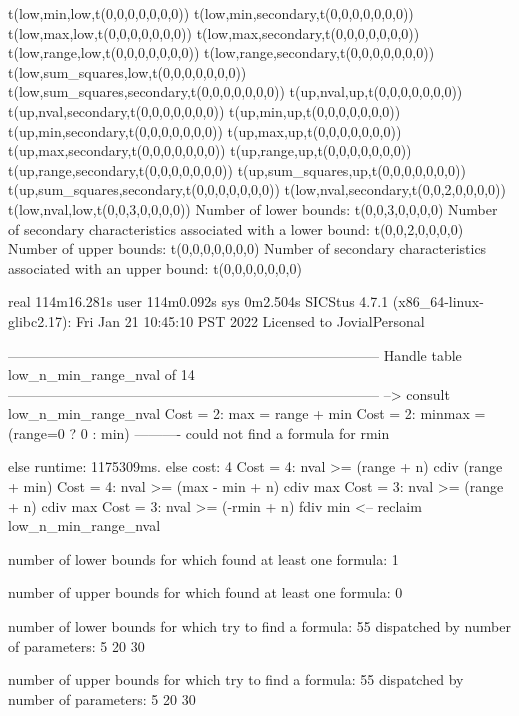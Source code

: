 t(low,min,low,t(0,0,0,0,0,0,0))
t(low,min,secondary,t(0,0,0,0,0,0,0))
t(low,max,low,t(0,0,0,0,0,0,0))
t(low,max,secondary,t(0,0,0,0,0,0,0))
t(low,range,low,t(0,0,0,0,0,0,0))
t(low,range,secondary,t(0,0,0,0,0,0,0))
t(low,sum_squares,low,t(0,0,0,0,0,0,0))
t(low,sum_squares,secondary,t(0,0,0,0,0,0,0))
t(up,nval,up,t(0,0,0,0,0,0,0))
t(up,nval,secondary,t(0,0,0,0,0,0,0))
t(up,min,up,t(0,0,0,0,0,0,0))
t(up,min,secondary,t(0,0,0,0,0,0,0))
t(up,max,up,t(0,0,0,0,0,0,0))
t(up,max,secondary,t(0,0,0,0,0,0,0))
t(up,range,up,t(0,0,0,0,0,0,0))
t(up,range,secondary,t(0,0,0,0,0,0,0))
t(up,sum_squares,up,t(0,0,0,0,0,0,0))
t(up,sum_squares,secondary,t(0,0,0,0,0,0,0))
t(low,nval,secondary,t(0,0,2,0,0,0,0))
t(low,nval,low,t(0,0,3,0,0,0,0))
Number of lower bounds:                                             t(0,0,3,0,0,0,0)
Number of secondary characteristics associated with a lower bound:  t(0,0,2,0,0,0,0)
Number of upper bounds:                                             t(0,0,0,0,0,0,0)
Number of secondary characteristics associated with an upper bound: t(0,0,0,0,0,0,0)

real	114m16.281s
user	114m0.092s
sys	0m2.504s
SICStus 4.7.1 (x86_64-linux-glibc2.17): Fri Jan 21 10:45:10 PST 2022
Licensed to JovialPersonal


--------------------------------------------------------------------------------
Handle table low_n_min_range_nval of 14
--------------------------------------------------------------------------------
--> consult low_n_min_range_nval
Cost =  2:  max    = range + min
Cost =  2:  minmax = (range=0 ? 0 : min)
----------
could not find a formula for rmin

else runtime: 1175309ms. else cost: 4
Cost =  4:  nval >= (range + n) cdiv (range + min) %
Cost =  4:  nval >= (max - min + n) cdiv max
Cost =  3:  nval >= (range + n) cdiv max
Cost =  3:  nval >= (-rmin + n) fdiv min %
<-- reclaim low_n_min_range_nval

number of lower bounds for which found at least one formula: 1

number of upper bounds for which found at least one formula: 0

number of lower bounds for which try to find a formula: 55
dispatched by number of parameters: 5  20  30

number of upper bounds for which try to find a formula: 55
dispatched by number of parameters: 5  20  30


